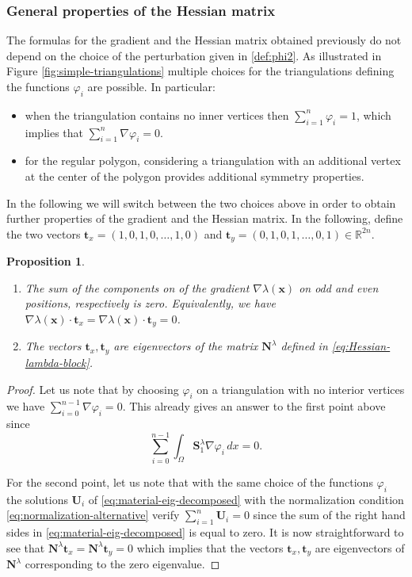 \documentclass[JEP,XML,SOM,Unicode,ThmDefs,NoFloatCountersInSection,published]{cedram}
\theoremstyle{plain}
\newtheorem{propo}[thm]{Proposition}
\theoremstyle{definition}
\newcommand{\bo}[1]{{\boldsymbol#1}}
\let\Bbb\mathbb
\begin{document}
\subsubsection*{General properties of the Hessian matrix} The formulas for the gradient and the Hessian matrix obtained previously do not depend on the choice of the perturbation given in \eqref{def:phi2}. As illustrated in Figure \ref{fig:simple-triangulations} multiple choices for the triangulations defining the functions $\varphi_i$ are possible. In particular:
\begin{itemize}
\item when the triangulation contains no inner vertices then $\sum_{i=1}^n \varphi_i=1$, which implies that $\sum_{i=1}^n \nabla \varphi_i = 0$.
\item for the regular polygon, considering a triangulation with an additional vertex at the center of the polygon provides additional symmetry properties.
\end{itemize}
In the following we will switch between the two choices above in order to obtain further properties of the gradient and the Hessian matrix. In the following, define the two vectors $\bo t_x = (1,0,1,0,\dots,1,0)$ and $\bo t_y = (0,1,0,1,\dots,0,1) \in \Bbb{R}^{2n}$.

\skpt
\begin{propo}\label{prop:translation-eigenvectors}
\begin{enumerate}
\item
The sum of the components on of the gradient $\nabla \lambda(\bo x)$ on odd and even positions, respectively is zero. Equivalently, we have $\nabla \lambda(\bo x) \cdot \bo t_x = \nabla \lambda(\bo x) \cdot \bo t_y = 0$.

\item
The vectors $\bo t_x, \bo t_y$ are eigenvectors of the matrix $\bo N^\lambda$ defined in \eqref{eq:Hessian-lambda-block}.
\end{enumerate}
\end{propo}

\begin{proof} Let us note that by choosing $\varphi_i$ on a triangulation with no interior vertices we have $\sum_{i=0}^{n-1} \nabla \varphi_i = 0$. This already gives an answer to the first point above since
\[
\sum_{i=0}^{n-1} \int_\Omega \bo S_1^\lambda \nabla \varphi_i\, dx = 0.
\]

For the second point, let us note that with the same choice of the functions $\varphi_i$ the solutions $\bo U_i$ of \eqref{eq:material-eig-decomposed} with the normalization condition \eqref{eq:normalization-alternative} verify $\sum_{i=1}^n \bo U_i = 0$ since the sum of the right hand sides in \eqref{eq:material-eig-decomposed} is equal to zero. It is now straightforward to see that $\bo N^\lambda \bo t_x = \bo N^\lambda \bo t_y = 0$ which implies that the vectors $\bo t_x,\bo t_y$ are eigenvectors of $\bo N^\lambda$ corresponding to the zero eigenvalue.
\end{proof}
\end{document}
